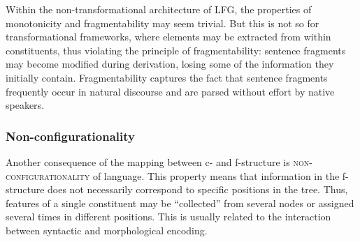 \documentclass[output=paper,hidelinks]{langscibook}
\begin{document}
 \begin{exe}
\ex\label{ex:fragment1}
 \end{exe}
 
 Within the non-transformational architecture of LFG, the properties of monotonicity and fragmentability may seem trivial. But this is not so for transformational frameworks, where elements may be extracted from within constituents, thus violating the principle of fragmentability: sentence fragments may become modified during derivation, losing some of the information they initially contain. Fragmentability captures the fact that sentence fragments frequently occur in natural discourse and are parsed without effort by native speakers.

 \subsubsection{Non-configurationality}
 
 Another consequence of the mapping between c- and f-structure is \textsc{non-con\-fi\-gu\-ra\-tio\-na\-li\-ty} of language. This property means that information in the f-structure does not necessarily correspond to specific positions in the tree. Thus, features of a single constituent may be ``collected'' from several nodes or assigned several times in different positions. This is usually related to the interaction between syntactic and morphological encoding.
 
\end{document}
